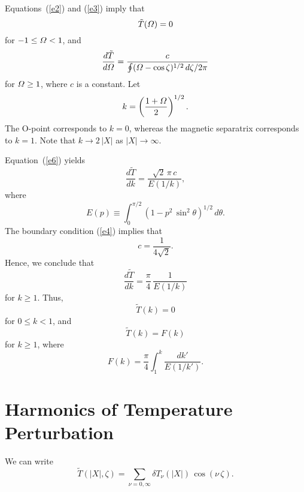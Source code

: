 \documentclass[12pt,prb,aps,notitlepage]{revtex4-1}
\begin{document}
Equations~(\ref{e2}) and (\ref{e3})
imply that
\begin{equation}
\tilde{T}({\mit\Omega}) = 0
\end{equation}
for $-1\leq {\mit\Omega}<1$, and
\begin{equation}\label{e6}
\frac{d\tilde{T}}{d{\mit\Omega}} = \frac{c}{\oint({\mit\Omega}-\cos\zeta)^{1/2}\,d\zeta/2\pi}
\end{equation}
for ${\mit\Omega}\geq 1$, where $c$ is a constant. 
Let
\begin{equation}
k = \left(\frac{1+{\mit\Omega}}{2}\right)^{1/2}.
\end{equation}
The O-point corresponds to $k=0$, whereas the magnetic separatrix corresponds to $k=1$. Note that $k\rightarrow 2\,|X|$ as $|X| \rightarrow\infty$. 

Equation~(\ref{e6}) yields
\begin{equation}
\frac{d\tilde{T}}{dk} = \frac{\sqrt{2}\,\pi\,c}{E(1/k)},
\end{equation}
where
\begin{equation}
E(p) \equiv \int_0^{\pi/2}(1-p^2\,\sin^2\theta)^{1/2}\,d\theta.
\end{equation}
The boundary condition (\ref{e4}) implies that
\begin{equation}
c = \frac{1}{4\sqrt{2}}.
\end{equation}
Hence, we conclude that
\begin{equation}
\frac{d\tilde{T}}{dk} =\frac{\pi}{4}\,\frac{1}{E(1/k)}
\end{equation}
for $k\geq 1$. 
Thus, 
\begin{equation}
\tilde{T}(k)= 0
\end{equation}
for $0\leq k< 1$, and
\begin{equation}
\tilde{T}(k)=F(k)
\end{equation}
for $k\geq 1$,
where
\begin{equation}
F(k) =\frac{\pi}{4}\int_1^k \frac{dk'}{E(1/k')}.
\end{equation}

\section{Harmonics of Temperature Perturbation}
We can write
\begin{equation}
\tilde{T}(|X|,\zeta) = \sum_{\nu=0,\infty}\delta T_\nu(|X|)\,\cos(\nu\,\zeta).
\end{equation}
\end{document}
